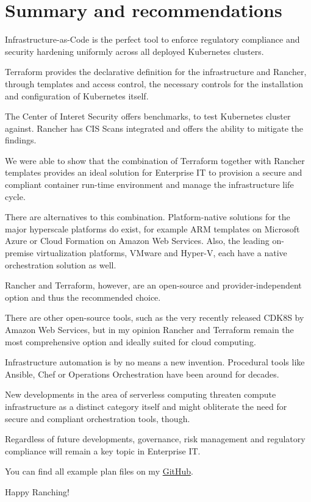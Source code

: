 %
%

\pagebreak
\section{Summary and recommendations}

\onehalfspacing

Infrastructure-as-Code is the perfect tool to enforce regulatory compliance and security hardening uniformly across all deployed Kubernetes clusters.

Terraform provides the declarative definition for the infrastructure and Rancher, through templates and access control, the necessary controls for the installation and configuration of Kubernetes itself.

The Center of Interet Security offers benchmarks, to test Kubernetes cluster against. Rancher has CIS Scans integrated and offers the ability to mitigate the findings.

We were able to show that the combination of Terraform together with Rancher templates provides an ideal solution for Enterprise IT to provision a secure and compliant container run-time environment and manage the infrastructure life cycle.

There are alternatives to this combination. Platform-native solutions for the major hyperscale platforms do exist, for example ARM templates on Microsoft Azure or Cloud Formation on Amazon Web Services. Also, the leading on-premise virtualization platforms, VMware and Hyper-V, each have a native orchestration solution as well.

Rancher and Terraform, however, are an open-source and provider-independent
option and thus the recommended choice.

There are other open-source tools, such as the very recently released CDK8S by Amazon Web Services, but in my opinion Rancher and Terraform remain the most comprehensive option and ideally suited for cloud computing.

Infrastructure automation is by no means a new invention. Procedural tools like Ansible, Chef or Operations Orchestration have been around for decades.

New developments in the area of serverless computing threaten compute infrastructure as a distinct category itself and might obliterate the need for secure and compliant orchestration tools, though.

Regardless of future developments, governance, risk management and regulatory compliance will remain a key topic in Enterprise IT.

You can find all example plan files on my  \href{https://github.com/chfrank-cgn/Rancher/tree/master/az-cluster-1}{GitHub}.

Happy Ranching!
